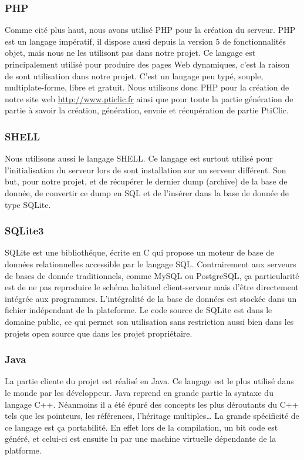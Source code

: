 \documentclass[a4paper,11pt,french]{article}
\begin{document}
{\subsubsection{PHP}
Comme cité plus haut, nous avons utilisé PHP pour la création du serveur. PHP est un langage impératif, il dispose aussi depuis la version 5 de fonctionnalités objet, mais nous ne les utilisont pas dans notre projet. Ce langage est
principalement utilisé pour produire des pages Web dynamiques, c'est la raison de sont utilisation dans notre projet. C'est un langage peu typé, souple, multiplate-forme, libre et gratuit.
Nous utilisons donc PHP pour la création de notre site web \url{http://www.pticlic.fr} ainsi que pour toute la partie génération de partie à savoir la création, génération, envoie et récupération de partie PtiClic.

\subsubsection{SHELL}
Nous utilisons aussi le langage SHELL. Ce langage est surtout utilisé pour l'initialisation du serveur lors de sont installation sur un serveur différent. Son but, pour notre projet, et de récupérer le dernier dump (archive) de la base de donnée, de convertir ce dump en SQL et de l'insérer dans la base de donnée de type SQLite.

\subsubsection{SQLite3}
SQLite est une bibliothéque, écrite en C qui propose un moteur de base de données relationnelles accessible par le langage SQL. Contrairement aux serveurs de bases de donnée traditionnels, comme MySQL ou PostgreSQL, ça particularité est de ne pas reproduire le schéma habituel client-serveur mais d'être directement intégrée aux programmes. L'intégralité de la base de données est stockée dans un fichier indépendant de la plateforme. Le code source de SQLite est dans le domaine public, ce qui permet son utilisation sans restriction aussi bien dans les projets open source que dans les projet propriétaire.

\subsubsection{Java}
La partie cliente du projet est réalisé en Java. Ce langage est le plus utilisé dans le monde par les développeur. Java reprend en grande partie la syntaxe du langage C++. Néanmoins il a été épuré des concepts les plus déroutants du C++ tels que les pointeurs, les références, l'héritage multiples\dots{} La grande spécificité de ce langage est ça portabilité. En effet lors de la compilation, un bit code est généré, et celui-ci est ensuite lu par une machine virtuelle dépendante de la platforme.

}
\end{document}
